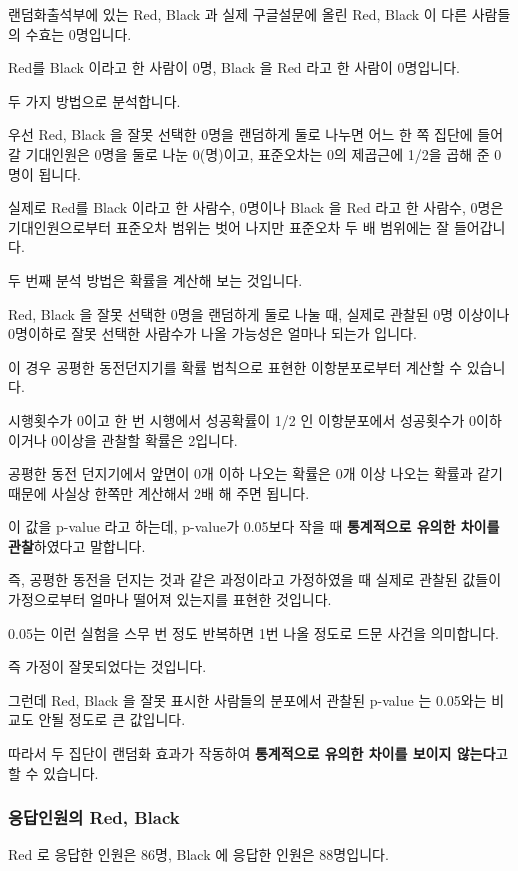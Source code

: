 \documentclass[
]{article}
\begin{document}
랜덤화출석부에 있는 Red, Black 과 실제 구글설문에 올린 Red, Black 이
다른 사람들의 수효는 0명입니다.

Red를 Black 이라고 한 사람이 0명, Black 을 Red 라고 한 사람이 0명입니다.

두 가지 방법으로 분석합니다.

우선 Red, Black 을 잘못 선택한 0명을 랜덤하게 둘로 나누면 어느 한 쪽
집단에 들어갈 기대인원은 0명을 둘로 나눈 0(명)이고, 표준오차는 0의
제곱근에 1/2을 곱해 준 0명이 됩니다.

실제로 Red를 Black 이라고 한 사람수, 0명이나 Black 을 Red 라고 한
사람수, 0명은 기대인원으로부터 표준오차 범위는 벗어 나지만 표준오차 두
배 범위에는 잘 들어갑니다.

두 번째 분석 방법은 확률을 계산해 보는 것입니다.

Red, Black 을 잘못 선택한 0명을 랜덤하게 둘로 나눌 때, 실제로 관찰된 0명
이상이나 0명이하로 잘못 선택한 사람수가 나올 가능성은 얼마나 되는가
입니다.

이 경우 공평한 동전던지기를 확률 법칙으로 표현한 이항분포로부터 계산할
수 있습니다.

시행횟수가 0이고 한 번 시행에서 성공확률이 1/2 인 이항분포에서
성공횟수가 0이하이거나 0이상을 관찰할 확률은 2입니다.

공평한 동전 던지기에서 앞면이 0개 이하 나오는 확률은 0개 이상 나오는
확률과 같기 때문에 사실상 한쪽만 계산해서 2배 해 주면 됩니다.

이 값을 p-value 라고 하는데, p-value가 0.05보다 작을 때
\textbf{통계적으로 유의한 차이를 관찰}하였다고 말합니다.

즉, 공평한 동전을 던지는 것과 같은 과정이라고 가정하였을 때 실제로
관찰된 값들이 가정으로부터 얼마나 떨어져 있는지를 표현한 것입니다.

0.05는 이런 실험을 스무 번 정도 반복하면 1번 나올 정도로 드문 사건을
의미합니다.

즉 가정이 잘못되었다는 것입니다.

그런데 Red, Black 을 잘못 표시한 사람들의 분포에서 관찰된 p-value 는
0.05와는 비교도 안될 정도로 큰 값입니다.

따라서 두 집단이 랜덤화 효과가 작동하여 \textbf{통계적으로 유의한 차이를
보이지 않는다}고 할 수 있습니다.

\subsubsection{응답인원의 Red,
Black}\label{uxc751uxb2f5uxc778uxc6d0uxc758-red-black}

Red 로 응답한 인원은 86명, Black 에 응답한 인원은 88명입니다.
\end{document}
